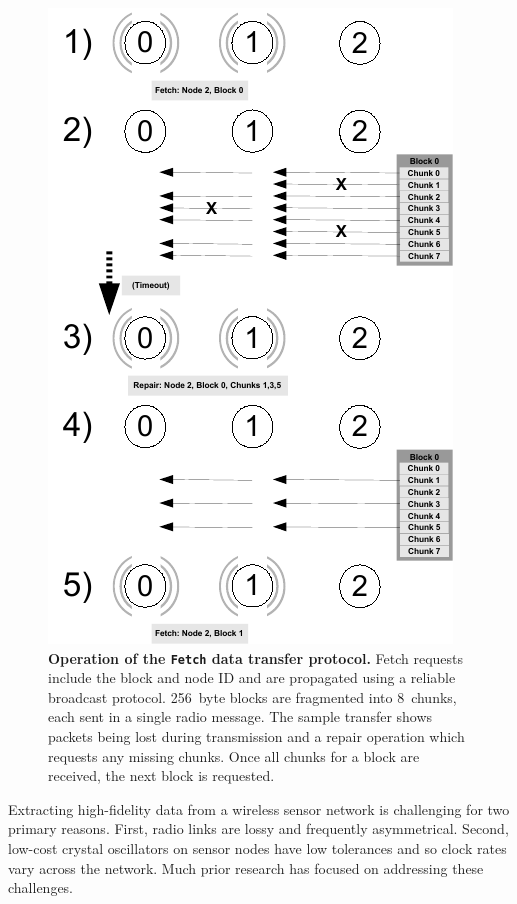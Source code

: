 \begin{figure}[t!]
\begin{center}
\includegraphics[width=0.7\hsize]{./3-evaluation/figs/fetchprotocol.pdf}
\end{center}

\caption{\textbf{Operation of the \texttt{Fetch} data transfer protocol.}
Fetch requests include the block and node ID and are propagated using a
reliable broadcast protocol. 256~byte blocks are fragmented into 8~chunks,
each sent in a single radio message. The sample transfer shows packets being
lost during transmission and a repair operation which requests any missing
chunks. Once all chunks for a block are received, the next block is
requested.}

\label{evaluation-fig-fetchprotocol}
\end{figure}

Extracting high-fidelity data from a wireless sensor network is challenging
for two primary reasons. First, radio links are lossy and frequently
asymmetrical. Second, low-cost crystal oscillators on sensor nodes have low
tolerances and so clock rates vary across the network. Much prior research
has focused on addressing these challenges.

